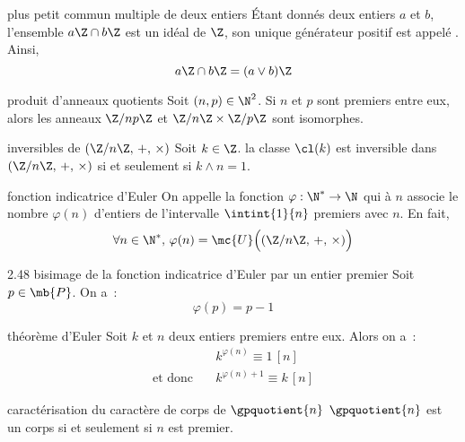 \begin{adjustwidth}{-3cm}{-3cm}
\begin{definition}{2.39}{plus petit commun multiple de deux entiers}
    Étant donnés deux entiers $a$ et $b$, l'ensemble $a\Z \cap b\Z$ est un idéal de $\Z$, son unique générateur positif est appelé . Ainsi,\, 
    $$a\Z \cap b\Z = (a \vee b) \Z$$
\end{definition}

\begin{theoreme}{2.44}{produit d'anneaux quotients}
    Soit $(n,p)\in \N^2$. Si $n$ et $p$ sont premiers entre eux, alors les anneaux $\Z/np\Z$ et $\Z/n\Z \times \Z/p\Z$ sont isomorphes.
\end{theoreme}

\begin{theoreme}{2.45}{inversibles de $(\Z /n\Z,\, +,\,  \times)$}
    Soit $k \in \Z$. la classe $\cl(k)$ est inversible dans $(\Z /n\Z,\, +,\,  \times)$ si et seulement si $k \wedge n = 1$.
\end{theoreme}

\begin{definition}{2.48}{fonction indicatrice d'Euler}
    On appelle  la fonction $\varphi:\N^*\to\N$ qui à $n$ associe le nombre $\varphi(n)$ d'entiers de l'intervalle $\intint{1}{n}$ premiers avec $n$. En fait,
    $$\forall n \in \N^*,\,  \varphi(n) = \mc{U}\Big((\Z/n\Z,\, +,\, \times)\Big)$$
\end{definition}

\begin{proposition}{2.48 bis}{image de la fonction indicatrice d'Euler par un entier premier}
    Soit $p \in \mb{P}$. On a~:
    $$\varphi(p) = p-1$$
\end{proposition}

\begin{proposition}{2.49}{théorème d'Euler}
    Soit $k$ et $n$ deux entiers premiers entre eux. Alors on a~:
    \begin{align*}
            &k^{\varphi(n)} \equiv 1 \, [n]\\
        \text{et donc} \quad &k^{\varphi(n)+1} \equiv k \, [n]
    \end{align*}
\end{proposition}

\begin{proposition}{2.50}{caractérisation du caractère de corps de $\gpquotient{n}$}
    $\gpquotient{n}$ est un corps si et seulement si $n$ est premier.
\end{proposition}


\end{adjustwidth}
